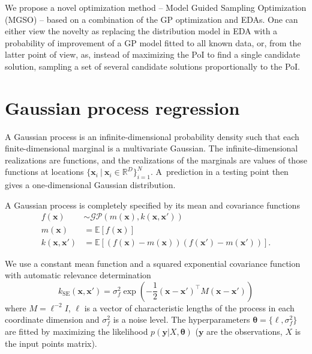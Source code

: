 \documentclass{sig-alternate}
\newcommand{\xx}{\mathrm{\mathbf{x}}}
\newcommand{\yy}{\mathrm{\mathbf{y}}}
\newcommand{\ttheta}{\mathbf{\theta}}
\newcommand{\eell}{\boldsymbol\ell}
\begin{document}
We propose a novel optimization method -- Model Guided Sampling Optimization (MGSO) -- based on a combination of 
the GP optimization and EDAs. One can either view the novelty as replacing the distribution model in EDA with 
a probability of improvement of a GP model fitted to all known data, or, from the latter point of view, as, 
instead of maximizing the PoI to find a single candidate solution, sampling a set of several candidate solutions proportionally to the PoI. 

\section{Gaussian process regression}

A Gaussian process \cite{rasmussen2006gaussian} is an infinite-dimensional probability density such that
each finite-dimensional marginal is a multivariate Gaussian. The
infinite-dimensional realizations are functions, and the
realizations of the marginals are values of those functions at locations $\{\xx_i \ | \ \xx_i \in \mathbb{R}^{D}\}_{i=1}^{N}$.
A~prediction in a testing point then gives a one-dimensional Gaussian distribution.

A Gaussian process is completely specified by its mean and covariance functions
\begin{align*}
  f(\xx) &\sim \mathcal{GP}\left( m(\xx), k(\xx, \xx')\right) \\
  m(\xx) &= \mathbb{E} \left[ f(\xx) \right] \\
  k(\xx, \xx') &= \mathbb{E} \left[ (f(\xx) - m(\xx))(f(\xx') - m(\xx')) \right].
\end{align*}

We use a constant mean function and a squared exponential covariance function with
automatic relevance determination
$$
  k_{\mathrm{SE}}(\xx, \xx') = \sigma_f^2 \exp\left( - \frac{1}{2} (\xx - \xx')^\top M (\xx - \xx') \right)
$$
where $ M = \eell^{-2}I $, $\eell$ is a vector of characteristic lengths of the process in each 
coordinate dimension and $\sigma_f^2$ is a noise level. The hyperparameters $\ttheta = \{ \eell, \sigma_f^2 \}$ 
are fitted by maximizing the likelihood $p(\yy | X, \ttheta)$ ($\yy$ are the observations, 
$X$ is the input points matrix). 
\end{document}
